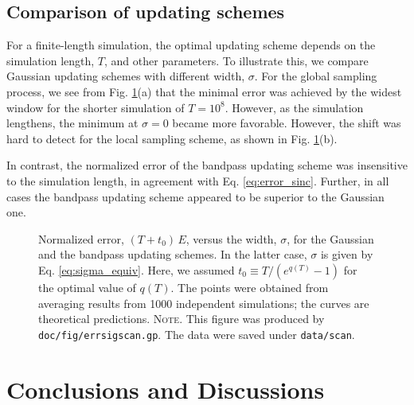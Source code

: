 \documentclass[reprint, floatfix]{revtex4-1}
\newcommand{\note}[1]{{\color{DarkGreen}\footnotesize \textsc{Note.} #1}}
\begin{document}
\subsection{Comparison of updating schemes}



For a finite-length simulation,
the optimal updating scheme
depends on the simulation length, $T$,
and other parameters.
%
To illustrate this,
we compare Gaussian updating schemes
with different width, $\sigma$.
%
For the global sampling process,
we see from Fig. \ref{fig:errsigscan}(a)
that the minimal error was achieved
by the widest window for the shorter simulation
of $T = 10^8$.
%
However, as the simulation lengthens,
the minimum at $\sigma = 0$ became more favorable.
%
However,
the shift was hard to detect
for the local sampling scheme,
as shown in Fig. \ref{fig:errsigscan}(b).


In contrast,
the normalized error of the bandpass updating scheme
was insensitive to the simulation length,
in agreement with Eq. \eqref{eq:error_sinc}.
%
Further, in all cases the bandpass updating scheme
appeared to be superior to the Gaussian one.



\begin{figure}[h]
\begin{center}
  \caption{
    \label{fig:errsigscan}
    Normalized error, $(T + t_0) \, E$,
    versus the width, $\sigma$,
    for the Gaussian
    and the bandpass updating schemes.
    In the latter case,
    $\sigma$ is given by Eq. \eqref{eq:sigma_equiv}.
    Here, we assumed $t_0 \equiv T/(e^{q(T)} - 1)$
    for the optimal value of $q(T)$.
    The points were obtained from averaging results
    from 1000 independent simulations;
    the curves are theoretical predictions.
    \note{This figure was produced by
      \texttt{doc/fig/errsigscan.gp}.
      The data were saved under
      \texttt{data/scan}.
    }%
  }
\end{center}
\end{figure}





\section{\label{sec:conclusion}
Conclusions and Discussions}
\end{document}
